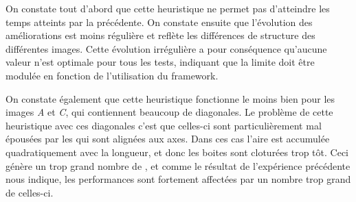 				On constate tout d'abord que cette heuristique ne permet pas d'atteindre les temps atteints par la précédente. On constate
				ensuite que l'évolution des améliorations est moins régulière et reflète les différences de structure des différentes images. 
				Cette évolution irrégulière a pour conséquence qu'aucune valeur n'est optimale pour tous les tests, indiquant que la limite doit
				être modulée en fonction de l'utilisation du framework. 

				On constate également que cette heuristique fonctionne le moins bien pour les images \emph{A} et \emph{C}, qui contiennent
				beaucoup de diagonales.  Le problème de cette heuristique avec ces diagonales c'est que celles-ci sont particulièrement mal
				épousées par les \BB qui sont alignées aux axes. Dans ces cas l'aire est accumulée quadratiquement avec la longueur, et donc
				les boites sont cloturées trop tôt. Ceci génère un trop grand nombre de \BO, et comme le résultat de l'expérience précédente
				nous indique, les performances sont fortement affectées par un nombre trop grand de celles-ci. 

